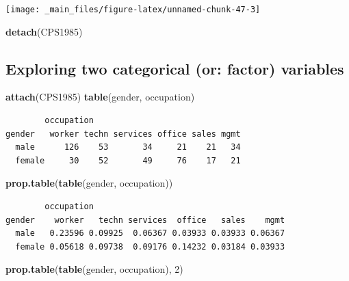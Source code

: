 \documentclass[
]{book}
\newenvironment{Shaded}{\begin{snugshade}}{\end{snugshade}}
\newcommand{\DecValTok}[1]{\textcolor[rgb]{0.00,0.00,0.81}{#1}}
\newcommand{\KeywordTok}[1]{\textcolor[rgb]{0.13,0.29,0.53}{\textbf{#1}}}
\newcommand{\NormalTok}[1]{#1}
\begin{document}
\begin{center}\texttt{[image: \_main\_files/figure-latex/unnamed-chunk-47-3]} \end{center}

\begin{Shaded}
\begin{Highlighting}[]
\KeywordTok{detach}\NormalTok{(CPS1985)}
\end{Highlighting}
\end{Shaded}

\hypertarget{exploring-two-categorical-or-factor-variables}{%
\subsection{Exploring two categorical (or: factor) variables}\label{exploring-two-categorical-or-factor-variables}}

\begin{Shaded}
\begin{Highlighting}[]
\KeywordTok{attach}\NormalTok{(CPS1985)}
\KeywordTok{table}\NormalTok{(gender, occupation)}
\end{Highlighting}
\end{Shaded}

\begin{verbatim}
        occupation
gender   worker techn services office sales mgmt
  male      126    53       34     21    21   34
  female     30    52       49     76    17   21
\end{verbatim}

\begin{Shaded}
\begin{Highlighting}[]
\KeywordTok{prop.table}\NormalTok{(}\KeywordTok{table}\NormalTok{(gender, occupation))}
\end{Highlighting}
\end{Shaded}

\begin{verbatim}
        occupation
gender    worker   techn services  office   sales    mgmt
  male   0.23596 0.09925  0.06367 0.03933 0.03933 0.06367
  female 0.05618 0.09738  0.09176 0.14232 0.03184 0.03933
\end{verbatim}

\begin{Shaded}
\begin{Highlighting}[]
\KeywordTok{prop.table}\NormalTok{(}\KeywordTok{table}\NormalTok{(gender, occupation), }\DecValTok{2}\NormalTok{)}
\end{Highlighting}
\end{Shaded}
\end{document}
